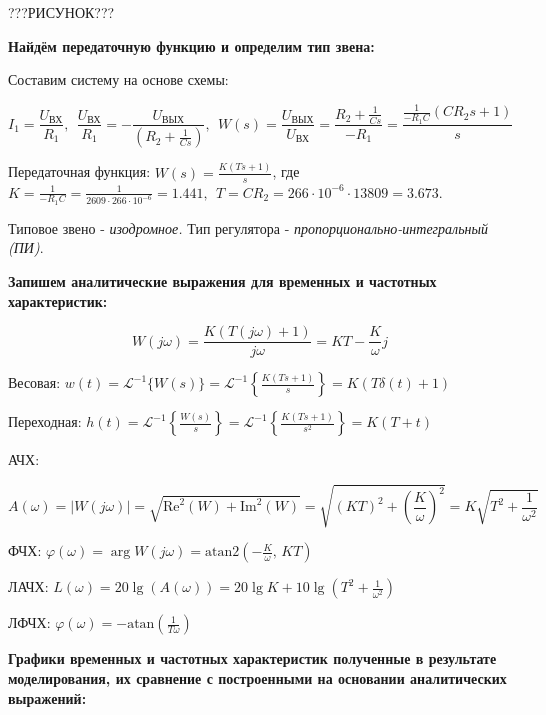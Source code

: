 ???РИСУНОК???

\textbf{Найдём передаточную функцию и определим тип звена:}

Составим систему на основе схемы:

\begin{par}
$$I_1 =\frac{U_{\text{ВХ}} }{R_1 },~~\frac{U_{\text{ВХ}} }{R_1 }=-\frac{U_{\text{ВЫХ}} }{\left(R_2 +\frac{1}{Cs}\right)},~~W(s)=\frac{U_{\text{ВЫХ}} }{U_{\text{ВХ}} }=\frac{R_2 +\frac{1}{Cs}}{-R_1 }=\frac{\frac{1}{-R_1 C}(CR_2 s+1)}{s}$$
\end{par}

Передаточная функция: $W(s)=\frac{K(Ts+1)}{s}$, где $K=\frac{1}{-R_1 C}=\frac{1}{2609\cdot 266\cdot 10^{-6} }=1.441,~~T=CR_2 =266\cdot 10^{-6} \cdot 13809=3.673$.

Типовое звено - \textit{изодромное. }Тип регулятора - \textit{пропорционально-интегральный (ПИ)}.

\textbf{Запишем аналитические выражения для временных и частотных характеристик:}

\begin{par}
$$W(j\omega )=\frac{K(T(j\omega )+1)}{j\omega }=KT-\frac{K}{\omega }j$$
\end{par}

Весовая: $w(t)={\mathcal{L}}^{-1} \lbrace W(s)\rbrace ={\mathcal{L}}^{-1} \left\lbrace \frac{K(Ts+1)}{s}\right\rbrace =K(T\delta (t)+1)$

Переходная: $h(t)={\mathcal{L}}^{-1} \left\lbrace \frac{W(s)}{s}\right\rbrace ={\mathcal{L}}^{-1} \left\lbrace \frac{K(Ts+1)}{s^2 }\right\rbrace =K(T+t)$

АЧХ: 

\begin{par}
$$A(\omega )=|W(j\omega )|=\sqrt{{\text{Re}}^2 (W)+{\text{Im}}^2 (W)}=\sqrt{(KT)^2 +{\left(\frac{K}{\omega }\right)}^2 }=K\sqrt{T^2 +\frac{1}{\omega^2 }}$$
\end{par}

ФЧХ: $\varphi (\omega )=\arg W(j\omega )=\text{atan2}\left(-\frac{K}{\omega },\,KT\right)$

ЛАЧХ: $L(\omega )=20\lg (A(\omega ))=20\lg K+10\lg \left(T^2 +\frac{1}{\omega^2 }\right)$

ЛФЧХ: $\varphi (\omega )=-\text{atan}\left(\frac{1}{T\omega }\right)$

\textbf{Графики временных и частотных характеристик полученные в результате моделирования, их сравнение с построенными на основании аналитических выражений:}



